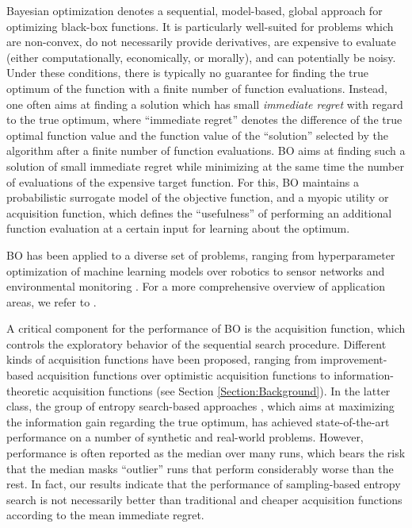 \documentclass[10pt,letterpaper]{article} %
\begin{document}
Bayesian optimization \citep[BO,][]{shahriari_taking_2016} denotes a sequential,
model-based, global approach for optimizing black-box functions. It is particularly well-suited for problems
which are non-convex, do not necessarily provide derivatives, are expensive to evaluate (either
computationally, economically, or morally), and can potentially be noisy. Under
these conditions, there is typically no guarantee for finding the true optimum of the
function with a finite number of function evaluations. Instead, one often aims
at finding a solution which has small \emph{immediate regret} with regard to the true optimum, where 
``immediate regret'' denotes the difference of the true optimal function value 
and the function value of the ``solution'' selected by the algorithm after a finite number of function evaluations. BO
aims at finding such a solution of small immediate regret while  minimizing at the same
time the number of evaluations of the expensive target function. For this, BO
maintains a probabilistic surrogate model of the objective function, and a
myopic utility or acquisition function, which defines the ``usefulness'' of
performing an additional function evaluation at a certain input for learning about the optimum.

BO has been applied to a diverse set of problems, ranging from hyperparameter optimization
of machine learning models \cite{bergstra_algorithms_2011,snoek_practical_2012} over robotics
\cite{calandra_bayesian_2015,lizotte_automatic_2007,kroemer_combining_2010,alonso_an_2015} to
sensor networks \cite{srinivas_gaussian_2010} and environmental monitoring
\cite{6385653}. For a more comprehensive overview of application areas, we refer
to \citet{shahriari_taking_2016}.

A critical component for the performance of BO is the acquisition function,
which controls the exploratory behavior of the sequential search procedure.
Different kinds of acquisition functions have been proposed, ranging from
improvement-based acquisition functions over optimistic acquisition functions to
information- theoretic acquisition functions (see Section
\ref{Section:Background}). In the latter class, the group of entropy
search-based approaches
\cite{villemonteix_informational_2008, hennig_entropy_2012,hernandez-lobato_predictive_2014}, 
which aims at maximizing the information gain regarding
the true optimum, has achieved state-of-the-art performance on a number of
synthetic and real-world problems. However, performance is often reported as the
median over many runs, which bears the risk that the median masks ``outlier'' runs that
perform considerably worse than the rest. In fact, our results indicate that
the performance of sampling-based entropy search is not necessarily better
than traditional and cheaper acquisition functions according to the mean immediate regret.
\end{document}

